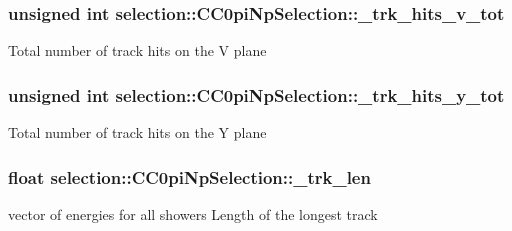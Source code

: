 \subsubsection[{\texorpdfstring{\+\_\+trk\+\_\+hits\+\_\+v\+\_\+tot}{_trk_hits_v_tot}}]{\setlength{\rightskip}{0pt plus 5cm}unsigned int selection\+::\+C\+C0pi\+Np\+Selection\+::\+\_\+trk\+\_\+hits\+\_\+v\+\_\+tot\hspace{0.3cm}{\ttfamily [private]}}\hypertarget{classselection_1_1CC0piNpSelection_a30fe5ccb6a299f7955125aa6c9d5923d}{}\label{classselection_1_1CC0piNpSelection_a30fe5ccb6a299f7955125aa6c9d5923d}
Total number of track hits on the V plane 
\subsubsection[{\texorpdfstring{\+\_\+trk\+\_\+hits\+\_\+y\+\_\+tot}{_trk_hits_y_tot}}]{\setlength{\rightskip}{0pt plus 5cm}unsigned int selection\+::\+C\+C0pi\+Np\+Selection\+::\+\_\+trk\+\_\+hits\+\_\+y\+\_\+tot\hspace{0.3cm}{\ttfamily [private]}}\hypertarget{classselection_1_1CC0piNpSelection_a76eb07fcb9190709464880c0ea7c4eba}{}\label{classselection_1_1CC0piNpSelection_a76eb07fcb9190709464880c0ea7c4eba}
Total number of track hits on the Y plane 
\subsubsection[{\texorpdfstring{\+\_\+trk\+\_\+len}{_trk_len}}]{\setlength{\rightskip}{0pt plus 5cm}float selection\+::\+C\+C0pi\+Np\+Selection\+::\+\_\+trk\+\_\+len\hspace{0.3cm}{\ttfamily [private]}}\hypertarget{classselection_1_1CC0piNpSelection_aab7945993678b44d7100abac6cc71655}{}\label{classselection_1_1CC0piNpSelection_aab7945993678b44d7100abac6cc71655}
vector of energies for all showers Length of the longest track 
